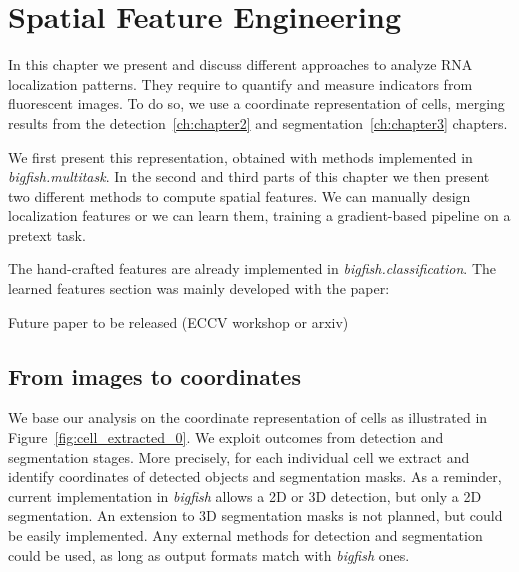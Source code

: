 
\graphicspath{{./figures/chapter4/}}


\chapter{Spatial Feature Engineering}
\label{ch:chapter4}

\minitoc
\newpage

In this chapter we present and discuss different approaches to analyze \ac{RNA} localization patterns.
They require to quantify and measure indicators from fluorescent images.
To do so, we use a coordinate representation of cells, merging results from the detection~\ref{ch:chapter2} and segmentation~\ref{ch:chapter3} chapters.

We first present this representation, obtained with methods implemented in \emph{bigfish.multitask}.
In the second and third parts of this chapter we then present two different methods to compute spatial features.
We can manually design localization features or we can learn them, training a gradient-based pipeline on a pretext task.

The hand-crafted features are already implemented in \emph{bigfish.classification}.
The learned features section was mainly developed with the paper:

\begin{center}
	\color{green}
	Future paper to be released (ECCV workshop or arxiv)
\end{center}

\section{From images to coordinates}
\label{sec:image_coordinates}

We base our analysis on the coordinate representation of cells as illustrated in Figure~\ref{fig:cell_extracted_0}.
We exploit outcomes from detection and segmentation stages.
More precisely, for each individual cell we extract and identify coordinates of detected objects and segmentation masks.
As a reminder, current implementation in \emph{bigfish} allows a 2D or 3D detection, but only a 2D segmentation.
An extension to 3D segmentation masks is not planned, but could be easily implemented.
Any external methods for detection and segmentation could be used, as long as output formats match with \emph{bigfish} ones.

